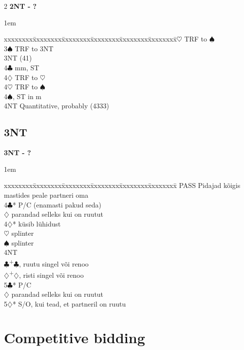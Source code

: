 \documentclass[10pt]{article}
\renewcommand{\c}{$\clubsuit$}
\renewcommand{\d}{$\diamondsuit$}
\newcommand{\h}{$\heartsuit$}
\newcommand{\s}{$\spadesuit$}
\newcommand{\p}{\textsuperscript{+}}
\newenvironment{bidtable}[1][]
{\textbf{#1}
  \begin{adjustwidth}{1em}{}
    \addvspace{2pt}
    \begin{tabbing}
      xxxxxxxx\=xxxxxxxx\=xxxxxxxx\=xxxxxxxx\=xxxxxxxx\=xxxxxxxx\=\kill}
{\end{tabbing}\end{adjustwidth}\bigskip}%
\begin{document}
\begin{multicols*}{2}
\begin{bidtable}[2NT - ?]
3\h \> TRF to \s                          \\
3\s \> TRF to 3NT                         \\
3NT (41)                             \\
4\c {} mm, ST                          \\
4\d \> TRF to \h                          \\
4\h \> TRF to \s                          \\
4\s {}, ST in m                      \\
4NT \> Quantitative, probably (4333)      \\
\end{bidtable}

\subsection{3NT}

\begin{bidtable}[3NT - ?]
PASS \> Pidajad kõigis mastides peale partneri oma \\
4\c* \> P/C (enamasti pakud seda)                  \\
     \d \> parandad selleks kui on ruutut      \\
4\d* \> küsib lühidust                             \\
     \h \> splinter                            \\
     \s \> splinter                            \\
     \> 4NT                                 \\
     \c {}\p\c , ruutu singel või renoo      \\
     \d {}\p\d , risti singel või renoo      \\
5\c* \> P/C                                        \\
     \d \> parandad selleks kui on ruutut      \\
5\d* \> S/O, kui tead, et partneril on ruutu
\end{bidtable}

\newpage

\section{Competitive bidding}


\end{multicols*}
\end{document}
